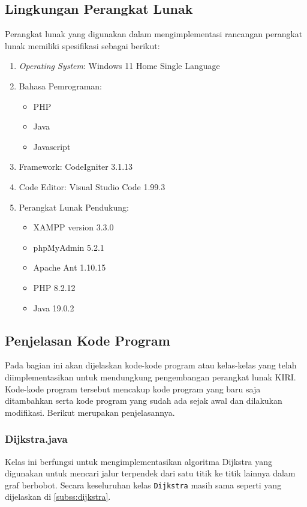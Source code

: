 \subsection{Lingkungan Perangkat Lunak}
\label{subsec:lingkunganperangkatlunak}
Perangkat lunak yang digunakan dalam mengimplementasi rancangan perangkat lunak memiliki spesifikasi sebagai berikut:
\begin{enumerate}
    \item \textit{Operating System}: Windows 11 Home Single Language
    \item Bahasa Pemrograman:
    \begin{itemize}
        \item PHP
        \item Java
        \item Javascript
    \end{itemize}
    \item Framework: CodeIgniter 3.1.13
    \item Code Editor: Visual Studio Code 1.99.3
    \item Perangkat Lunak Pendukung:
    \begin{itemize}
        \item XAMPP version 3.3.0
        \item phpMyAdmin 5.2.1
        \item Apache Ant 1.10.15
        \item PHP 8.2.12
        \item Java 19.0.2
    \end{itemize}
\end{enumerate}

\subsection{Penjelasan Kode Program}
\label{subsec:penjelasankode}
Pada bagian ini akan dijelaskan kode-kode program atau kelas-kelas yang telah diimplementasikan untuk mendungkung pengembangan perangkat lunak KIRI. Kode-kode program tersebut mencakup kode program yang baru saja ditambahkan serta kode program yang sudah ada sejak awal dan dilakukan modifikasi. Berikut merupakan penjelasannya.

\subsubsection{Dijkstra.java}
Kelas ini berfungsi untuk mengimplementasikan algoritma Dijkstra yang digunakan untuk mencari jalur terpendek dari satu titik ke titik lainnya dalam graf berbobot. Secara keseluruhan kelas \texttt{Dijkstra} masih sama seperti yang dijelaskan di \ref{subss:dijkstra}.

